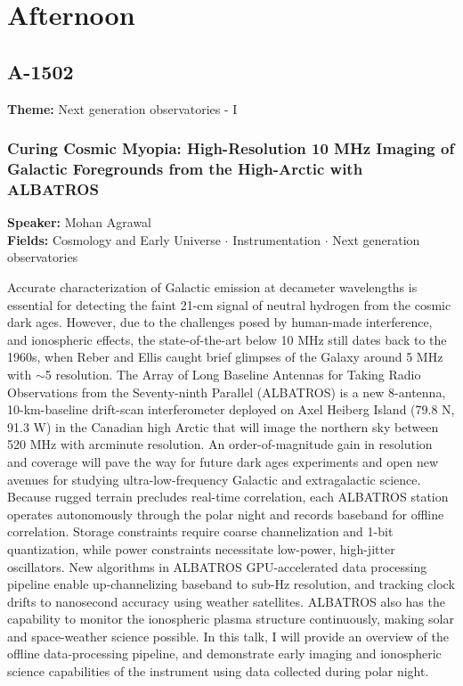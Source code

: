\section*{Afternoon}

\subsection*{A-1502}
\textbf{Theme:} Next generation observatories - I

\hypertarget{abstract-talk-200}{}\label{abstract-page-talk-200}
\subsubsection*{Curing Cosmic Myopia: High-Resolution 10 MHz Imaging of Galactic Foregrounds from the High-Arctic with ALBATROS}
\textbf{Speaker:} Mohan Agrawal\\
\textbf{Fields:} Cosmology and Early Universe $\cdot$ Instrumentation $\cdot$ Next generation observatories

Accurate characterization of Galactic emission at decameter wavelengths is essential for detecting the faint 21-cm signal of neutral hydrogen from the cosmic dark ages. However, due to the challenges posed by human-made interference, and ionospheric effects, the state-of-the-art below 10 MHz still dates back to the 1960s, when Reber and Ellis caught brief glimpses of the Galaxy around 5 MHz with $\sim$5 resolution. The Array of Long Baseline Antennas for Taking Radio Observations from the Seventy-ninth Parallel (ALBATROS) is a new 8-antenna, 10-km-baseline drift-scan interferometer deployed on Axel Heiberg Island (79.8 N, 91.3 W) in the Canadian high Arctic that will image the northern sky between 520 MHz with arcminute resolution. An order-of-magnitude gain in resolution and coverage will pave the way for future dark ages experiments and open new avenues for studying ultra-low-frequency Galactic and extragalactic science. Because rugged terrain precludes real-time correlation, each ALBATROS station operates autonomously through the polar night and records baseband for offline correlation. Storage constraints require coarse channelization and 1-bit quantization, while power constraints necessitate low-power, high-jitter oscillators. New algorithms in ALBATROS GPU-accelerated data processing pipeline enable up-channelizing baseband to sub-Hz resolution, and tracking clock drifts to nanosecond accuracy using weather satellites. ALBATROS also has the capability to monitor the ionospheric plasma structure continuously, making solar and space-weather science possible. In this talk, I will provide an overview of the offline data-processing pipeline, and demonstrate early imaging and ionospheric science capabilities of the instrument using data collected during polar night.

